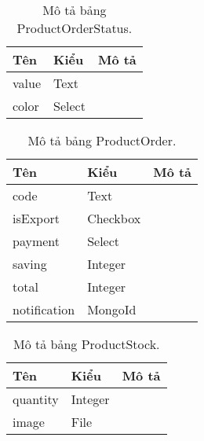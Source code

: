 \begin{table}[p]
\begin{center}
\begin{tabular}{ |l|l|l| } 
	\hline
	Tên & Kiểu & Mô tả \\
	\hline
	value & Text & \dotfill \\
color & Select & \dotfill \\ 
	\hline
\end{tabular}
	\caption{Mô tả bảng ProductOrderStatus.}
	\label{table:ProductOrderStatus}
\end{center}
\end{table}


\begin{table}[p]
\begin{center}
\begin{tabular}{ |l|l|l| } 
	\hline
	Tên & Kiểu & Mô tả \\
	\hline
	code & Text & \dotfill \\
isExport & Checkbox & \dotfill \\
payment & Select & \dotfill \\
saving & Integer & \dotfill \\
total & Integer & \dotfill \\
notification & MongoId & \dotfill \\ 
	\hline
\end{tabular}
	\caption{Mô tả bảng ProductOrder.}
	\label{table:ProductOrder}
\end{center}
\end{table}


\begin{table}[p]
\begin{center}
\begin{tabular}{ |l|l|l| } 
	\hline
	Tên & Kiểu & Mô tả \\
	\hline
	quantity & Integer & \dotfill \\
image & File & \dotfill \\ 
	\hline
\end{tabular}
	\caption{Mô tả bảng ProductStock.}
	\label{table:ProductStock}
\end{center}
\end{table}


